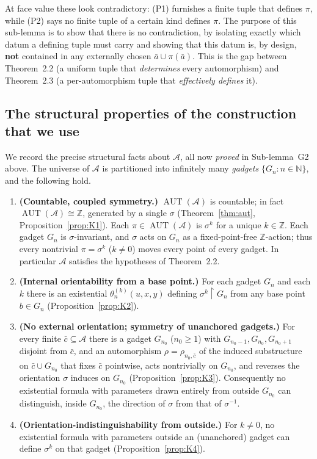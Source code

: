 \documentclass[12pt,fullpage]{article}
\theoremstyle{definition}
\newcommand{\A}{\mathcal{A}}
\newcommand{\N}{\mathbb{N}}
\newcommand{\Z}{{\mathbb{Z}}}
\newcommand{\AUT}{\operatorname{AUT}}
\begin{document}
At face value these look contradictory: (P1) furnishes a finite tuple that
defines $\pi$, while (P2) says no finite tuple of a certain kind defines
$\pi$.  The purpose of this sub-lemma is to show that there is no
contradiction, by isolating exactly which datum a defining tuple must carry
and showing that this datum is, by design, \textbf{not} contained in any
externally chosen $\bar a\cup\pi(\bar a)$.  This is the gap between
Theorem~2.2 (a uniform tuple that \emph{determines} every automorphism) and
Theorem~2.3 (a per-automorphism tuple that \emph{effectively defines} it).

\subsection*{The structural properties of the construction that we use}

We record the precise structural facts about $\A$, all now \emph{proved} in
Sub-lemma~G2 above.  The universe of $\A$ is partitioned into infinitely many
\emph{gadgets} $\{G_n:n\in\N\}$, and the following hold.

\begin{enumerate}[label=\textbf{(K\arabic*)}]
\item \textbf{(Countable, coupled symmetry.)}\label{K1}
  $\AUT(\A)$ is countable; in fact $\AUT(\A)\cong\Z$, generated by a single
  $\sigma$ (Theorem~\ref{thm:aut}, Proposition~\ref{prop:K1}).  Each
  $\pi\in\AUT(\A)$ is $\sigma^{k}$ for a unique $k\in\Z$.  Each gadget $G_n$ is
  $\sigma$-invariant, and $\sigma$ acts on $G_n$ as a fixed-point-free
  $\Z$-action; thus every nontrivial $\pi=\sigma^k$ ($k\neq0$) moves every
  point of every gadget.  In particular $\A$ satisfies the hypotheses of
  Theorem~2.2.

\item \textbf{(Internal orientability from a base point.)}\label{K2}
  For each gadget $G_n$ and each $k$ there is an existential
  $\theta_n^{(k)}(u,x,y)$ defining $\sigma^k\restriction G_n$ from any base
  point $b\in G_n$ (Proposition~\ref{prop:K2}).

\item \textbf{(No external orientation; symmetry of unanchored gadgets.)}\label{K3}
  For every finite $\bar c\subseteq\A$ there is a gadget $G_{n_0}$
  ($n_0\ge 1$) with $G_{n_0-1},G_{n_0},G_{n_0+1}$ disjoint from $\bar c$, and
  an automorphism $\rho=\rho_{n_0,\bar c}$ of the induced substructure on
  $\bar c\cup G_{n_0}$ that fixes $\bar c$ pointwise, acts nontrivially on
  $G_{n_0}$, and reverses the orientation $\sigma$ induces on $G_{n_0}$
  (Proposition~\ref{prop:K3}).  Consequently no existential formula with
  parameters drawn entirely from outside $G_{n_0}$ can distinguish, inside
  $G_{n_0}$, the direction of $\sigma$ from that of $\sigma^{-1}$.

\item \textbf{(Orientation-indistinguishability from outside.)}\label{K4}
  For $k\ne0$, no existential formula with parameters outside an (unanchored)
  gadget can define $\sigma^k$ on that gadget
  (Proposition~\ref{prop:K4}).
\end{enumerate}
\end{document}
